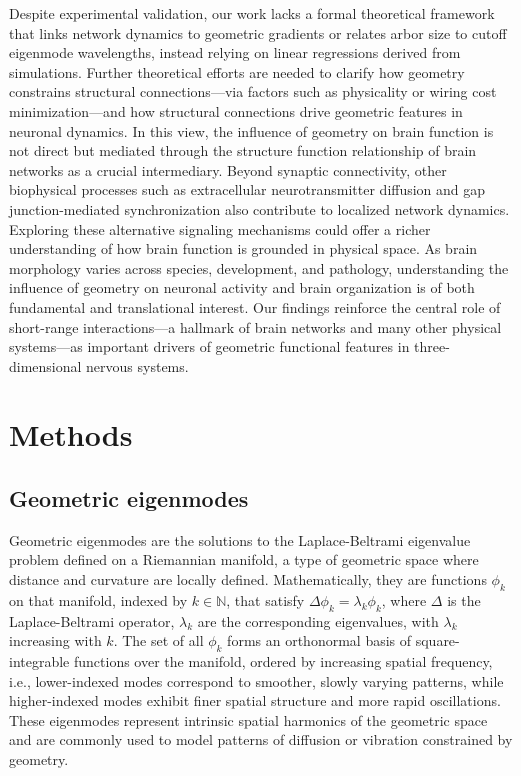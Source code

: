 \documentclass{article}
\begin{document}
Despite experimental validation, our work lacks a formal theoretical framework that links network dynamics to geometric gradients or relates arbor size to cutoff eigenmode wavelengths, instead relying on linear regressions derived from simulations. Further theoretical efforts are needed to clarify how geometry constrains structural connections---via factors such as physicality\cite{posfai2024impact} or wiring cost minimization\cite{bullmore2012economy}---and how structural connections drive geometric features in neuronal dynamics. In this view, the influence of geometry on brain function is not direct but mediated through the structure function relationship of brain networks as a crucial intermediary\cite{suarez2020linking, fotiadis2024structure}. Beyond synaptic connectivity, other biophysical processes such as extracellular neurotransmitter diffusion\cite{randi2023neural} and gap junction-mediated synchronization\cite{ponce2018whole} also contribute to localized network dynamics. Exploring these alternative signaling mechanisms could offer a richer understanding of how brain function is grounded in physical space. As brain morphology varies across species, development, and pathology\cite{thompson2004mapping}, understanding the influence of geometry on neuronal activity\cite{pang2023geometric} and brain organization\cite{pang2025geometric} is of both fundamental and translational interest. Our findings reinforce the central role of short-range interactions---a hallmark of brain networks and many other physical systems---as important drivers of geometric functional features in three-dimensional nervous systems.

\section*{Methods}

\subsection*{Geometric eigenmodes}

Geometric eigenmodes are the solutions to the Laplace-Beltrami eigenvalue problem defined on a Riemannian manifold, a type of geometric space where distance and curvature are locally defined. Mathematically, they are functions $\phi_k$ on that manifold, indexed by $k\in \mathbb{N}$, that satisfy $\Delta \phi_k=\lambda_k\phi_k$, where $\Delta$ is the Laplace-Beltrami operator, $\lambda_k$ are the corresponding eigenvalues, with $\lambda_k$ increasing with $k$. The set of all $\phi_k$ forms an orthonormal basis of square-integrable functions over the manifold, ordered by increasing spatial frequency, i.e., lower-indexed modes correspond to smoother, slowly varying patterns, while higher-indexed modes exhibit finer spatial structure and more rapid oscillations. These eigenmodes represent intrinsic spatial harmonics of the geometric space and are commonly used to model patterns of diffusion or vibration constrained by geometry. 
\end{document}
